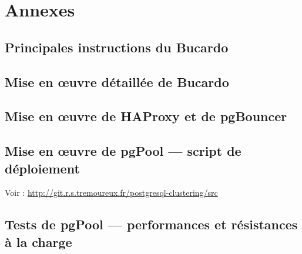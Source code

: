 \documentclass[12pt]{report}
\begin{document}
\chapter*{Annexes}

\section{Principales instructions du Bucardo}



\section{Mise en œuvre détaillée de Bucardo}



\section{Mise en œuvre de HAProxy et de pgBouncer}



\section{Mise en œuvre de pgPool — script de déploiement}

Voir : \url{http://git.r.s.tremoureux.fr/postgresql-clustering/src}

\section{Tests de pgPool — performances et résistances à la charge}


\end{document}
